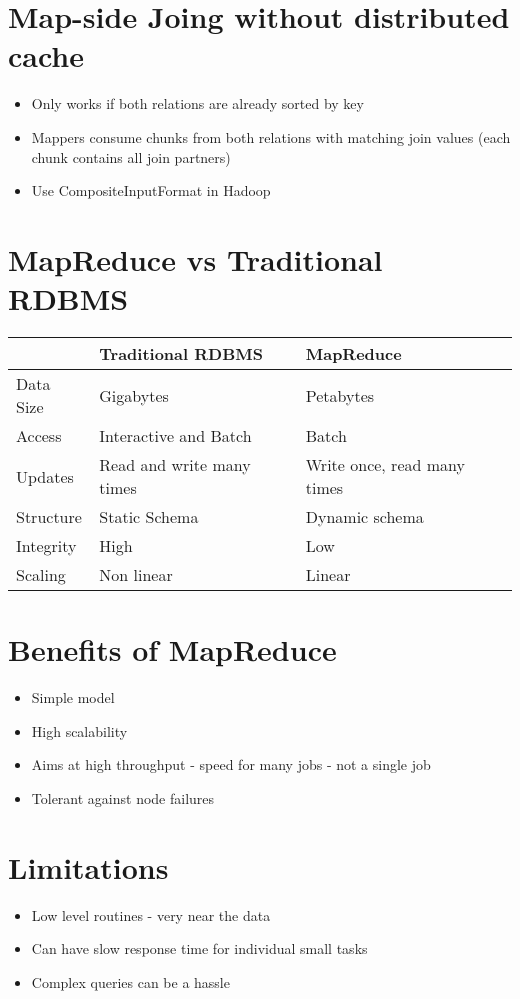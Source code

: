 \documentclass[10pt,a4paper]{scrreprt}
\begin{document}
\section{Map-side Joing without distributed cache}
\begin{itemize}
	\item Only works if both relations are already sorted by key
	\item Mappers consume chunks from both relations with matching join values (each chunk contains all join partners)
	\item Use CompositeInputFormat in Hadoop
\end{itemize}

\section{MapReduce vs Traditional RDBMS}
\begin{table}[]
	\begin{tabular}{l|l|l}
		& Traditional RDBMS         & MapReduce                   \\ \hline
		Data Size & Gigabytes                 & Petabytes                   \\
		Access    & Interactive and Batch     & Batch                       \\
		Updates   & Read and write many times & Write once, read many times \\
		Structure & Static Schema             & Dynamic schema              \\
		Integrity & High                      & Low                         \\
		Scaling   & Non linear                & Linear                     
	\end{tabular}
\end{table}

\section{Benefits of MapReduce}
\begin{itemize}
	\item Simple model
	\item High scalability
	\item Aims at high throughput - speed for many jobs - not a single job
	\item Tolerant against node failures
\end{itemize}

\section{Limitations}
\begin{itemize}
	\item Low level routines - very near the data
	\item Can have slow response time for individual small tasks
	\item Complex queries can be a hassle
\end{itemize}
\end{document}
